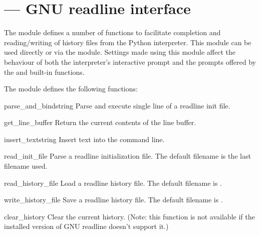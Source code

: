 \section{ ---
         GNU readline interface}



The  module defines a number of functions to
facilitate completion and reading/writing of history files from the
Python interpreter.  This module can be used directly or via the
 module.  Settings made using 
this module affect the behaviour of both the interpreter's interactive prompt 
and the prompts offered by the  and 
built-in functions.

The  module defines the following functions:


\begin{funcdesc}{parse_and_bind}{string}
Parse and execute single line of a readline init file.
\end{funcdesc}

\begin{funcdesc}{get_line_buffer}{}
Return the current contents of the line buffer.
\end{funcdesc}

\begin{funcdesc}{insert_text}{string}
Insert text into the command line.
\end{funcdesc}

\begin{funcdesc}{read_init_file}{}
Parse a readline initialization file.
The default filename is the last filename used.
\end{funcdesc}

\begin{funcdesc}{read_history_file}{}
Load a readline history file.
The default filename is .
\end{funcdesc}

\begin{funcdesc}{write_history_file}{}
Save a readline history file.
The default filename is .
\end{funcdesc}

\begin{funcdesc}{clear_history}{}
Clear the current history.  (Note: this function is not available if
the installed version of GNU readline doesn't support it.)
\end{funcdesc}

